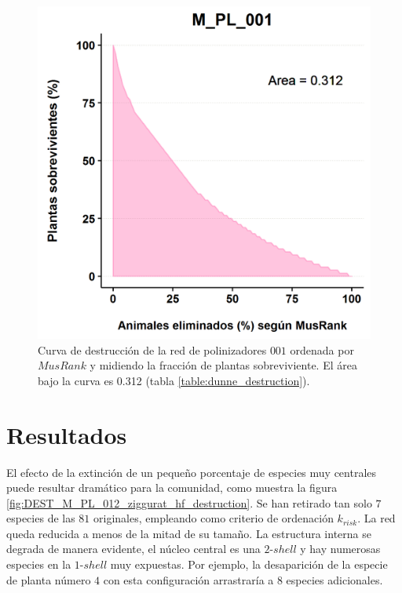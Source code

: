 \begin{figure}[h!]
\centering
\includegraphics[scale=0.8]{Figures/DEST_M_PL_001_MRdunne_extinction_plot.png}
\caption{Curva de destrucción de la red de polinizadores $001$ ordenada por $MusRank$ y midiendo la fracción de plantas sobreviviente. El área bajo la curva es 0.312 (tabla \ref{table:dunne_destruction}).}
\label{fig:DEST_M_PL_001_MRdunne_extinction_plot}
\end{figure}

\section{Resultados}

El efecto de la extinción de un pequeño porcentaje de especies muy centrales puede resultar dramático para la comunidad, como muestra la figura \ref{fig:DEST_M_PL_012_ziggurat_hf_destruction}. Se han retirado tan solo $7$ especies de las $81$ originales, empleando como criterio de ordenación ${k}_{risk}$. La red queda reducida a menos de la mitad de su tamaño. La estructura interna se degrada de manera evidente, el núcleo central es una $2$-$shell$ y hay numerosas especies en la $1$-$shell$ muy expuestas. Por ejemplo, la desaparición de la especie de planta número $4$ con esta configuración arrastraría a $8$ especies adicionales.

